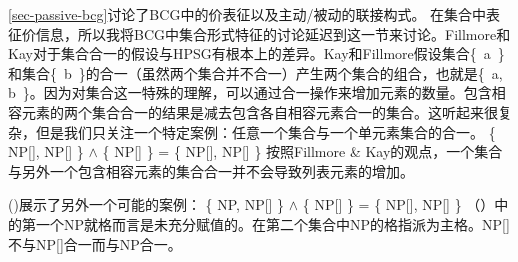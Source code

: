 \ref{sec-passive-bcg}讨论了BCG中的价表征以及主动/被动的联接构式。 在集合中表征价信息，所以我将BCG中集合形式特征的讨论延迟到这一节来讨论。Fillmore和Kay对于集合合一的假设与HPSG有根本上的差异。Kay和Fillmore假设集合\{~a~\}和集合\mbox{\{ b \}}的合一（虽然两个集合并不合一）产生两个集合的组合，也就是\{~a, b~\}。因为对集合这一特殊的理解，可以通过合一操作来增加元素的数量。包含相容元素的两个集合合一的结果是减去包含各自相容元素合一的集合。这听起来很复杂，但是我们只关注一个特定案例：任意一个集合与一个单元素集合的合一。
\ea
\{ NP[], NP[] \} $\wedge$ \{ NP[] \} = \{ NP[], NP[] \}
\z
按照Fillmore \& Kay的观点，一个集合与另外一个包含相容元素的集合合一并不会导致列表元素的增加。

\noindent
()展示了另外一个可能的案例：
\ea
\{ NP, NP[] \} $\wedge$ \{ NP[] \} = \{ NP[], NP[] \}
\z
（）中的第一个NP就格而言是未充分赋值的。在第二个集合中NP的格指派为主格。NP[]不与NP[]合一而与NP合一。

